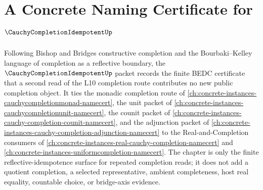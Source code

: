 \chapter{A Concrete Naming Certificate for $\CauchyCompletionIdempotentUp$}
\label{ch:concrete-instances-cauchy-completion-idempotent-namecert}

Following Bishop and Bridges constructive completion and the Bourbaki--Kelley language of completion as a reflective boundary, the $\CauchyCompletionIdempotentUp$ packet records the finite BEDC certificate that a second read of the L10 completion route contributes no new public completion object. It ties the monadic completion route of \autoref{ch:concrete-instances-cauchycompletionmonad-namecert}, the unit packet of \autoref{ch:concrete-instances-cauchycompletionunit-namecert}, the counit packet of \autoref{ch:concrete-instances-cauchy-completion-counit-namecert}, and the adjunction packet of \autoref{ch:concrete-instances-cauchy-completion-adjunction-namecert} to the Real-and-Completion consumers of \autoref{ch:concrete-instances-real-cauchy-completion-namecert} and \autoref{ch:concrete-instances-uniformcompletion-namecert}. The chapter is only the finite reflective-idempotence surface for repeated completion reads; it does not add a quotient completion, a selected representative, ambient completeness, host real equality, countable choice, or bridge-axis evidence.

